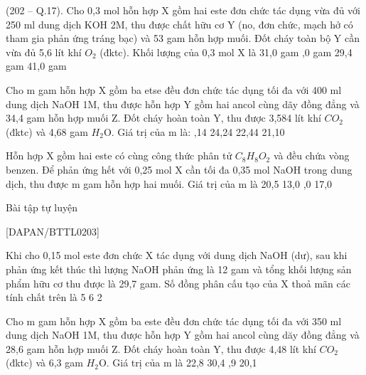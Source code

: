 \begin{vdex}[3]%
	(202 – Q.17). Cho 0,3 mol hỗn hợp X gồm hai este đơn chức tác dụng vừa đủ với 250 ml dung dịch KOH 2M, thu được chất hữu cơ Y (no, đơn chức, mạch hở có tham gia phản ứng tráng bạc) và 53 gam hỗn hợp muối. Đốt cháy toàn bộ Y cần vừa đủ 5,6 lít khí ${O}_2$ (đktc). Khối lượng của 0,3 mol X là
	\choice
	{ 31,0 gam}
	{,0 gam}
	{ 29,4 gam}
	{ 41,0 gam}
	\huongdan
	{%
		
}
\end{vdex}
%




\begin{vdex}[3][(QG.18 - 203)]%
	Cho m gam hỗn hợp X gồm ba etse đều đơn chức tác dụng tối đa với 400 ml dung dịch NaOH 1M, thu được hỗn hợp Y gồm hai ancol cùng dãy đồng đẳng và 34,4 gam hỗn hợp muối Z. Đốt cháy hoàn toàn Y, thu được 3,584 lít khí ${CO}_2$ (đktc) và 4,68 gam ${H}_2$O. Giá trị của m là:
	\choice
	{,14}
	{ 24,24}
	{ 22,44}
	{ 21,10}
	\huongdan{%
		
	}
\end{vdex}

\begin{vdex}[3][MH2 - 2020]%
	 Hỗn hợp X gồm hai este có cùng công thức phân tử ${C}_8{H}_8{O}_2$ và đều chứa vòng benzen. Để phản ứng hết với 0,25 mol X cần tối đa 0,35 mol NaOH trong dung dịch, thu được m gam hỗn hợp hai muối. Giá trị của m là
	\choice
	{ 20,5}
	{ 13,0}
	{,0}
	{ 17,0}
	\huongdan{%
		
		}
\end{vdex}
\begin{bttl}{Bài tập tự luyện}
\end{bttl}
[DAPAN/BTTL0203]

\begin{ex}[3]%
 Khi cho 0,15 mol este đơn chức X tác dụng với dung dịch NaOH (dư), sau khi phản ứng kết thúc thì lượng NaOH phản ứng là 12 gam và tổng khối lượng sản phẩm hữu cơ thu được là 29,7 gam. Số đồng phân cấu tạo của X thoả mãn các tính chất trên là
	\choice
	{ 5}
	{ 6}
	{ 2}
	{}
	\sodongkeex[8]
	\loigiai{
	}
\end{ex}

\begin{ex}[3]%
Cho m gam hỗn hợp X gồm ba este đều đơn chức tác dụng tối đa với 350 ml dung dịch NaOH 1M, thu được hỗn hợp Y gồm hai ancol cùng dăy đồng đẳng và 28,6 gam hỗn hợp muối Z. Đốt cháy hoàn toàn Y, thu được 4,48 lít khí ${CO}_2$ (đktc) và 6,3 gam ${H}_2$O. Giá trị của m là
	\choice
	{ 22,8}
	{ 30,4}
	{,9}
	{ 20,1}
	\sodongkeex[8]
	\loigiai
{%
	
}
\end{ex}

